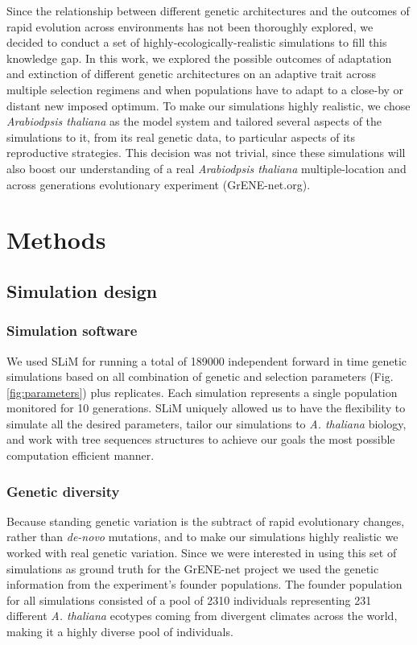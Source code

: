 \documentclass{article}
\begin{document}
Since the relationship between different genetic architectures and the outcomes of rapid evolution across environments has not been thoroughly explored, we decided to conduct a set of highly-ecologically-realistic simulations to fill this knowledge gap. In this work, we explored the possible outcomes of adaptation and extinction of different genetic architectures on an adaptive trait across multiple selection regimens and when populations have to adapt to a close-by or distant new imposed optimum. To make our simulations highly realistic, we chose \textit{Arabiodpsis thaliana} as the model system and tailored several aspects of the simulations to it, from its real genetic data, to particular aspects of its reproductive strategies. This decision was not trivial, since these simulations will also boost our understanding of a real \textit{Arabiodpsis thaliana} multiple-location and across generations evolutionary experiment (GrENE-net.org). 

\section{Methods}

\subsection{Simulation design}
\subsubsection{Simulation software}
We used SLiM \citep{Haller2019-oj} for running a total of 189000 independent forward in time genetic simulations based on all combination of genetic and selection parameters (Fig. \ref{fig:parameters}) plus replicates. Each simulation represents a single population monitored for 10 generations. SLiM uniquely allowed us to have the flexibility to simulate all the desired parameters, tailor our simulations to \textit{A. thaliana} biology, and work with tree sequences structures to achieve our goals the most possible computation efficient manner.

\subsubsection{Genetic diversity}
Because standing genetic variation is the subtract of rapid evolutionary changes, rather than \textit{de-novo} mutations, and to make our simulations highly realistic we worked with real genetic variation. Since we were interested in using this set of simulations as ground truth for the GrENE-net project we used the genetic information from the experiment's founder populations. The founder population for all simulations consisted of a pool of 2310 individuals representing 231 different \textit{A. thaliana} ecotypes coming from divergent climates across the world, making it a highly diverse pool of individuals. 
\end{document}
